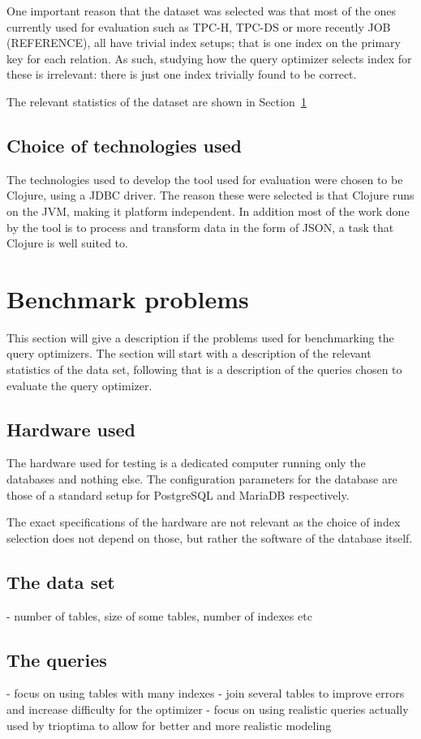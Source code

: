 One important reason that the dataset was selected was that most of the ones
currently used for evaluation such as TPC-H, TPC-DS or more recently JOB (REFERENCE), all
have trivial index setups; that is one index on the primary key for each
relation. As such, studying how the query optimizer selects index for these is
irrelevant: there is just one index trivially found to be correct.

The relevant statistics of the dataset are shown in Section~\ref{sec:benchmark}

\subsection{Choice of technologies used}
The technologies used to develop the tool used for evaluation were chosen to be
Clojure, using a JDBC driver. The reason these were selected is that Clojure
runs on the JVM, making it platform independent. In addition most of the work
done by the tool is to process and transform data in the form of JSON, a task
that Clojure is well suited to.

\section{Benchmark problems}\label{sec:benchmark}
This section will give a description if the problems used for benchmarking the
query optimizers. The section will start with a description of the relevant
statistics of the data set, following that is a description of the queries
chosen to evaluate the query optimizer.

\subsection{Hardware used}
The hardware used for testing is a dedicated computer running only the databases
and nothing else. The configuration parameters for the database are those of a
standard setup for PostgreSQL and MariaDB respectively.

The exact specifications of the hardware are not relevant as the choice of index
selection does not depend on those, but rather the software of the database itself.

\subsection{The data set}
- number of tables, size of some tables, number of indexes etc

\subsection{The queries}
- focus on using tables with many indexes
- join several tables to improve errors and increase difficulty for the optimizer
- focus on using realistic queries actually used by trioptima to allow for
better and more realistic modeling

